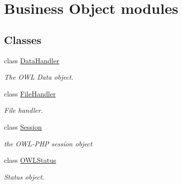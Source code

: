 \hypertarget{group__OWL__BO__LAYER}{
\section{Business Object modules}
\label{group__OWL__BO__LAYER}
}
\subsection*{Classes}
\begin{CompactItemize}
\item 
class \hyperlink{classDataHandler}{DataHandler}
\begin{CompactList}\small\item\em The OWL Data object. \item\end{CompactList}\item 
class \hyperlink{classFileHandler}{FileHandler}
\begin{CompactList}\small\item\em File handler. \item\end{CompactList}\item 
class \hyperlink{classSession}{Session}
\begin{CompactList}\small\item\em the OWL-PHP session object \item\end{CompactList}\item 
class \hyperlink{classOWLStatus}{OWLStatus}
\begin{CompactList}\small\item\em Status object. \item\end{CompactList}\end{CompactItemize}
